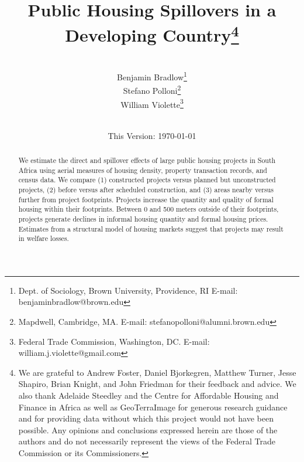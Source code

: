 \documentclass[12pt]{article}
\begin{document}
\begin{titlepage} 
\title{{Public Housing Spillovers in a Developing Country}\thanks{We are grateful to Andrew Foster, Daniel Bjorkegren, Matthew Turner, Jesse Shapiro, Brian Knight, and John Friedman for their feedback and advice.  We also thank Adelaide Steedley and the Centre for Affordable Housing and Finance in Africa as well as GeoTerraImage for generous research guidance and for providing data without which this project would not have been possible.  Any opinions and conclusions expressed herein are those of the authors and do not necessarily represent the views of the Federal Trade Commission or its Commissioners.}}
\author{\\[3em] Benjamin Bradlow\thanks{Dept. of Sociology, Brown University, Providence, RI  E-mail: benjamin\textunderscore bradlow@brown.edu}\\
 Stefano Polloni\thanks{Mapdwell, Cambridge, MA.  E-mail: stefano\textunderscore polloni@alumni.brown.edu}\\ 
  William Violette\thanks{Federal Trade Commission, Washington, DC. E-mail: william.j.violette@gmail.com} \\
 \\ 
  }
\date{\vspace{5mm}This Version: \today}
\maketitle
\begin{abstract}




	We estimate the direct and spillover effects of large public housing projects in South Africa using aerial measures of housing density, property transaction records, and census data.  We compare (1) constructed projects versus planned but unconstructed projects, (2) before versus after scheduled construction, and (3) areas nearby versus further from project footprints.  Projects increase the quantity and quality of formal housing within their footprints.  Between 0 and 500 meters outside of their footprints, projects generate declines in informal housing quantity and formal housing prices.  Estimates from a structural model of housing markets suggest that projects may result in welfare losses.


\end{abstract}
\end{titlepage}
\end{document}
